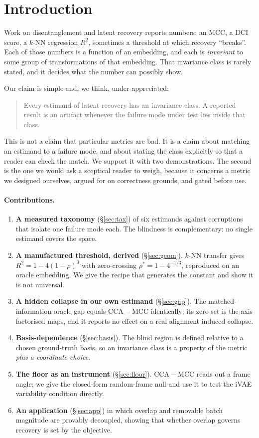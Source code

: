 \documentclass[10pt]{article}
\newcommand{\gap}{\ensuremath{\mathrm{CCA}\!-\!\mathrm{MCC}}}
\begin{document}
\section{Introduction}

Work on disentanglement and latent recovery reports numbers: an MCC, a DCI score, a $k$-NN regression
$R^{2}$, sometimes a threshold at which recovery ``breaks''. Each of those numbers is a function of an
embedding, and each is \emph{invariant} to some group of transformations of that embedding. That
invariance class is rarely stated, and it decides what the number can possibly show.

Our claim is simple and, we think, under-appreciated:

\begin{quote}
Every estimand of latent recovery has an invariance class. A reported result is an artifact whenever
the failure mode under test lies inside that class.
\end{quote}

This is not a claim that particular metrics are bad. It is a claim about matching an estimand to a
failure mode, and about stating the class explicitly so that a reader can check the match. We support
it with two demonstrations. The second is the one we would ask a sceptical reader to weigh, because it
concerns a metric we designed ourselves, argued for on correctness grounds, and gated before use.

\paragraph{Contributions.}
\begin{enumerate}\itemsep2pt
\item \textbf{A measured taxonomy} (\S\ref{sec:tax}) of six estimands against corruptions that isolate
one failure mode each. The blindness is complementary: no single estimand covers the space.
\item \textbf{A manufactured threshold, derived} (\S\ref{sec:geom}). $k$-NN transfer gives
$R^{2}=1-4(1-\rho)^{3}$ with zero-crossing $\rho^{*}=1-4^{-1/3}$, reproduced on an oracle embedding. We
give the recipe that generates the constant and show it is not universal.
\item \textbf{A hidden collapse in our own estimand} (\S\ref{sec:gap}). The matched-information oracle
gap equals $\gap$ identically; its zero set is the axis-factorised maps, and it reports no effect on a
real alignment-induced collapse.
\item \textbf{Basis-dependence} (\S\ref{sec:basis}). The blind region is defined relative to a chosen
ground-truth basis, so an invariance class is a property of the metric \emph{plus a coordinate choice}.
\item \textbf{The floor as an instrument} (\S\ref{sec:floor}). $\gap$ reads out a frame angle; we give
the closed-form random-frame null and use it to test the iVAE variability condition directly.
\item \textbf{An application} (\S\ref{sec:app}) in which overlap and removable batch magnitude are
provably decoupled, showing that whether overlap governs recovery is set by the objective.
\end{enumerate}
\end{document}

